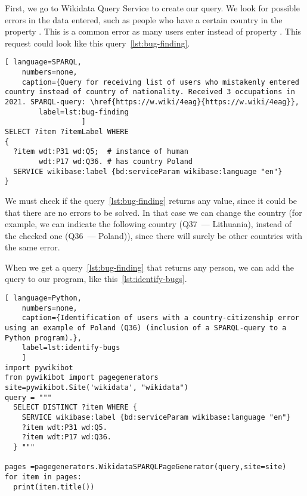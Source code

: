 First, we go to Wikidata Query Service %
 to create our query. 
We look for possible errors in the data entered, such as people who have a certain country in the property .
This is a common error as many users enter  instead of property .
This request could look like this query~\ref{lst:bug-finding}.

\renewcommand{\lstlistingname}{Query} %
\begin{lstlisting}[ language=SPARQL,
    numbers=none,
    caption={Query for receiving list of users who mistakenly entered country instead of country of nationality. Received 3 occupations in 2021. SPARQL-query: \href{https://w.wiki/4eag}{https://w.wiki/4eag}},
        label=lst:bug-finding
                  ]
SELECT ?item ?itemLabel WHERE 
{
  ?item wdt:P31 wd:Q5;  # instance of human
        wdt:P17 wd:Q36. # has country Poland
  SERVICE wikibase:label {bd:serviceParam wikibase:language "en"}
}
\end{lstlisting}
\renewcommand{\lstlistingname}{Listing} %

We must check if the query~\ref{lst:bug-finding} returns any value,
since it could be that there are no errors to be solved. 
In that case we can change the country 
(for example, we can indicate the following country (Q37~--- Lithuania), instead of the checked one (Q36~--- Poland)), 
since there will surely be other countries with the same error.

When we get a query~\ref{lst:bug-finding} that returns any person, 
we can add the query to our program, like this~\ref{lst:identify-bugs}.

\begin{lstlisting}[ language=Python,
    numbers=none,
    caption={Identification of users with a country-citizenship error using an example of Poland (Q36) (inclusion of a SPARQL-query to a Python program).},
    label=lst:identify-bugs
    ]
import pywikibot
from pywikibot import pagegenerators
site=pywikibot.Site('wikidata', "wikidata")
query = """
  SELECT DISTINCT ?item WHERE {
    SERVICE wikibase:label {bd:serviceParam wikibase:language "en"}
    ?item wdt:P31 wd:Q5.
    ?item wdt:P17 wd:Q36.
  } """

pages =pagegenerators.WikidataSPARQLPageGenerator(query,site=site)
for item in pages:
  print(item.title())
\end{lstlisting}    

